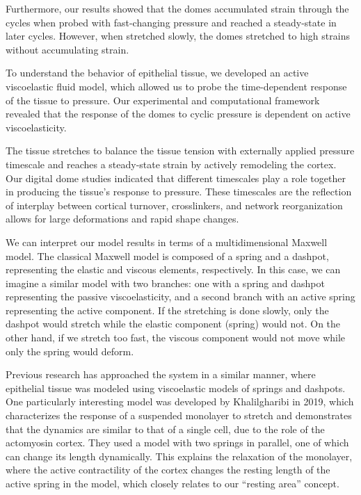 Furthermore, our results showed that the domes accumulated strain
through the cycles when probed with fast-changing pressure and reached a
steady-state in later cycles. However, when stretched slowly, the domes
stretched to high strains without accumulating strain.

To understand the behavior of epithelial tissue, we developed an active
viscoelastic fluid model, which allowed us to probe the time-dependent
response of the tissue to pressure. Our experimental and computational
framework revealed that the response of the domes to cyclic pressure is
dependent on active viscoelasticity.

The tissue stretches to balance the tissue tension with externally
applied pressure timescale and reaches a steady-state strain by actively
remodeling the cortex. Our digital dome studies indicated that different
timescales play a role together in producing the tissue's response to
pressure. These timescales are the reflection of interplay between
cortical turnover, crosslinkers, and network reorganization allows for
large deformations and rapid shape changes.

We can interpret our model results in terms of a multidimensional
Maxwell model. The classical Maxwell model is composed of a spring and a
dashpot, representing the elastic and viscous elements, respectively. In
this case, we can imagine a similar model with two branches: one with a
spring and dashpot representing the passive viscoelasticity, and a
second branch with an active spring representing the active component.
If the stretching is done slowly, only the dashpot would stretch while
the elastic component (spring) would not. On the other hand, if we
stretch too fast, the viscous component would not move while only the
spring would deform.

Previous research has approached the system in a similar manner, where
epithelial tissue was modeled using viscoelastic models of springs and
dashpots. One particularly interesting model was developed by
Khalilgharibi in 2019, which characterizes the response of a suspended
monolayer to stretch and demonstrates that the dynamics are similar to
that of a single cell, due to the role of the actomyosin cortex. They
used a model with two springs in parallel, one of which can change its
length dynamically. This explains the relaxation of the monolayer, where
the active contractility of the cortex changes the resting length of the
active spring in the model, which closely relates to our ``resting
area'' concept.

